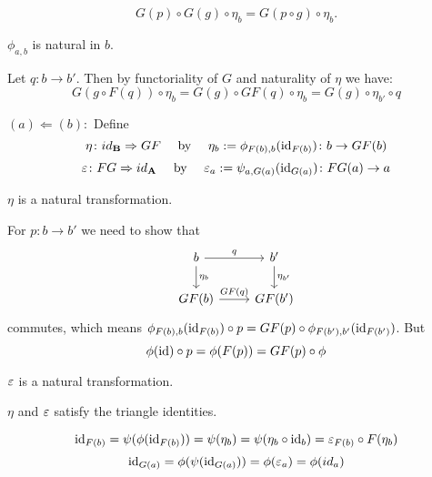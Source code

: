 \begin{bigproof}
\begin{smallproof}
    \[
       G(p) \circ G(g) \circ \eta_b = G(p \circ g) \circ \eta_b.
    \]
\end{smallproof}
\begin{claim}
    $\phi_{a,b}$ is natural in $b$.
\end{claim}
\begin{smallproof}
    Let $q \colon b \to b'$. Then by functoriality of $G$ and naturality of $\eta$ we have: 
    \[
       G(g \circ F(q)) \circ \eta_b = G(g) \circ GF(q) \circ \eta_b
       = G(g) \circ \eta_{b'} \circ q
     \]
\end{smallproof}
$(a)\Longleftarrow (b):$ Define 
\[
    \eta \colon id_{\mathbf{B}} \Rightarrow GF \quad \text{ by } \quad \eta_b := \phi_{F(b),b}(\operatorname{id}_{F(b)})
    \colon b \to GF(b) \\
\]
\[
    \varepsilon \colon FG \Rightarrow id_{\mathbf{A}} \quad \text{ by } \quad \varepsilon_a := \psi_{a,G(a)}(\operatorname{id}_{G(a)})
    \colon FG(a) \to a
\]
\begin{claim}
    $\eta$ is a natural transformation.
\end{claim}
\begin{smallproof}
    For $p \colon b \to b'$ we need to show that 
    \[
        \begin{tikzcd}
            b \arrow[r,"q"] \arrow[d,"\eta_b"] 
              & b' \arrow[d,"\eta_{b'}"] \\
            GF(b) \arrow[r,"GF(q)"]
              & GF(b')
        \end{tikzcd}
    \]
    commutes, which means $\phi_{F(b),b}(\operatorname{id}_{F(b)}) \circ p 
    = GF(p) \circ \phi_{F(b'),b'}(\operatorname{id}_{F(b')})$. 
    But 
    \[
        \phi(\operatorname{id}) \circ p = \phi(F(p)) = GF(p) \circ \phi
    \]
\end{smallproof}
\begin{claim}
    $\varepsilon$ is a natural transformation.
\end{claim}
\begin{smallproof}
\end{smallproof}
\begin{claim} 
    $\eta$ and $\varepsilon$ satisfy the triangle identities.
\end{claim}
\begin{smallproof}
    \[
        \operatorname{id}_{F(b)} = \psi(\phi(\operatorname{id}_{F(b)})) = \psi(\eta_b) 
        = \psi(\eta_b \circ \operatorname{id}_b) = \varepsilon_{F(b)} \circ F(\eta_b)
    \]
    \[
       \operatorname{id}_{G(a)} = \phi(\psi(\operatorname{id}_{G(a)})) = \phi(\varepsilon_a) = \phi(id_a) 
    \]
\end{smallproof}
\end{bigproof}
